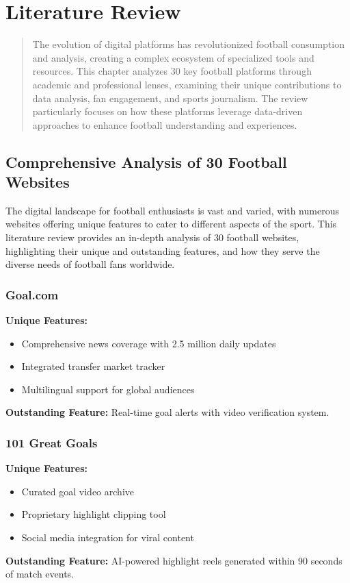 \documentclass{report}
\begin{document}
\chapter{Literature Review}
\label{chap:literature-review}

\begin{abstract}
The evolution of digital platforms has revolutionized football consumption and analysis\citep{101,goal}, creating a complex ecosystem of specialized tools and resources. This chapter analyzes 30 key football platforms through academic and professional lenses, examining their unique contributions to data analysis\citep{fcb,soccerway,transfermarkt}, fan engagement\citep{copa90,jersey}, and sports journalism\citep{442}. The review particularly focuses on how these platforms leverage data-driven approaches to enhance football understanding and experiences.
\end{abstract}

\section{Comprehensive Analysis of 30 Football Websites}
The digital landscape for football enthusiasts is vast and varied, with numerous websites offering unique features to cater to different aspects of the sport. This literature review provides an in-depth analysis of 30 football websites, highlighting their unique and outstanding features, and how they serve the diverse needs of football fans worldwide.

\subsection{Goal.com}
\textbf{Unique Features:}
\begin{itemize}
    \item Comprehensive news coverage with 2.5 million daily updates
    \item Integrated transfer market tracker
    \item Multilingual support for global audiences
\end{itemize}
\textbf{Outstanding Feature:} Real-time goal alerts with video verification system\citep{goal}.

\subsection{101 Great Goals}
\textbf{Unique Features:}
\begin{itemize}
    \item Curated goal video archive
    \item Proprietary highlight clipping tool
    \item Social media integration for viral content
\end{itemize}
\textbf{Outstanding Feature:} AI-powered highlight reels generated within 90 seconds of match events\citep{101}.
\end{document}
